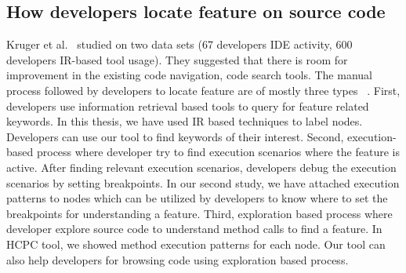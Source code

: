 \subsection{How developers locate feature on source code}
\label{related:feature_locate}
Kruger et al.~\cite{kruger2019features} studied on two data sets (67 developers IDE activity, 600 developers IR-based tool usage). They suggested that there is room for improvement in the existing code navigation, code search tools. The manual process followed by developers to locate feature are of mostly three types ~\cite{damevski2016field, wang2011exploratory, revelle2005understanding}. First, developers use information retrieval based tools to query for feature related keywords. In this thesis, we have used IR based techniques to label nodes. Developers can use our tool to find keywords of their interest. Second, execution-based process where developer try to find execution scenarios where the feature is active. After finding relevant execution scenarios, developers debug the execution scenarios by setting breakpoints. In our second study, we have attached execution patterns to nodes which can be utilized by developers to know where to set the breakpoints for understanding a feature. Third, exploration based process where developer explore source code to understand method calls to find a feature. In HCPC tool, we showed method execution patterns for each node. Our tool can also help developers for browsing code using exploration based process.
